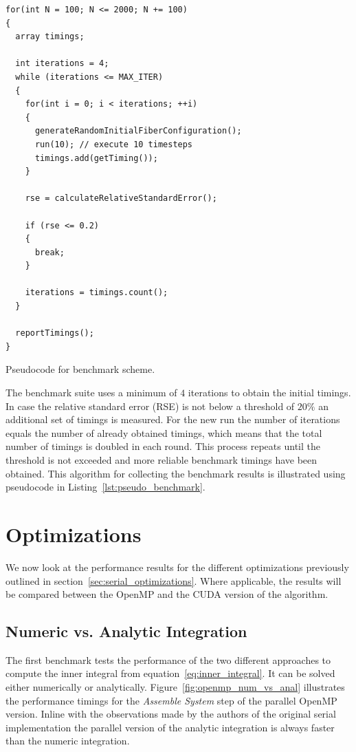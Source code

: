 \documentclass[a4paper,11pt]{kth-mag}
\begin{document}
\begin{listing}[!htbp]
  \centering
  \begin{verbatim}
for(int N = 100; N <= 2000; N += 100)
{
  array timings;

  int iterations = 4;
  while (iterations <= MAX_ITER)
  {
    for(int i = 0; i < iterations; ++i)
    {
      generateRandomInitialFiberConfiguration();
      run(10); // execute 10 timesteps
      timings.add(getTiming());
    }

    rse = calculateRelativeStandardError();

    if (rse <= 0.2)
    {
      break;
    }

    iterations = timings.count();
  }

  reportTimings();
}
  \end{verbatim}
  \caption{Pseudocode for benchmark scheme.}
  \label{lst:pseudo_benchmark}
\end{listing}

The benchmark suite uses a minimum of $4$ iterations to obtain the initial timings. In case the relative standard error (RSE) is not below a threshold of $20\%$ an additional set of timings is measured. For the new run the number of iterations equals the number of already obtained timings, which means that the total number of timings is doubled in each round. This process repeats until the threshold is not exceeded and more reliable benchmark timings have been obtained. This algorithm for collecting the benchmark results is illustrated using pseudocode in Listing~\ref{lst:pseudo_benchmark}.

\section{Optimizations}

We now look at the performance results for the different optimizations previously outlined in section~\ref{sec:serial_optimizations}. Where applicable, the results will be compared between the OpenMP and the CUDA version of the algorithm.

\subsection{Numeric vs. Analytic Integration}
\label{subsec:bench_numeric_vs_analytic}

The first benchmark tests the performance of the two different approaches to compute the inner integral from equation~\eqref{eq:inner_integral}. It can be solved either numerically or analytically. Figure~\ref{fig:openmp_num_vs_anal} illustrates the performance timings for the \emph{Assemble System} step of the parallel OpenMP version. Inline with the observations made by the authors of the original serial implementation \cite{Tornberg2006} the parallel version of the analytic integration is always faster than the numeric integration.
\end{document}
